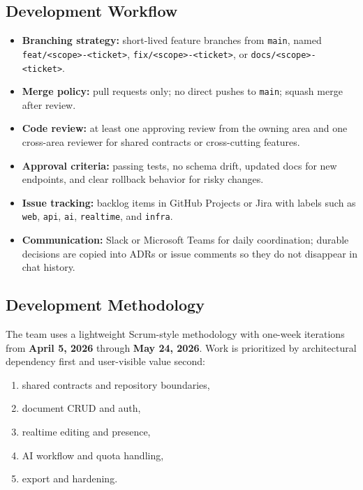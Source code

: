 \subsection{Development Workflow}

\begin{itemize}[leftmargin=1.3em]
    \item \textbf{Branching strategy:} short-lived feature branches from \texttt{main}, named \texttt{feat/<scope>-<ticket>}, \texttt{fix/<scope>-<ticket>}, or \texttt{docs/<scope>-<ticket>}.
    \item \textbf{Merge policy:} pull requests only; no direct pushes to \texttt{main}; squash merge after review.
    \item \textbf{Code review:} at least one approving review from the owning area and one cross-area reviewer for shared contracts or cross-cutting features.
    \item \textbf{Approval criteria:} passing tests, no schema drift, updated docs for new endpoints, and clear rollback behavior for risky changes.
    \item \textbf{Issue tracking:} backlog items in GitHub Projects or Jira with labels such as \texttt{web}, \texttt{api}, \texttt{ai}, \texttt{realtime}, and \texttt{infra}.
    \item \textbf{Communication:} Slack or Microsoft Teams for daily coordination; durable decisions are copied into ADRs or issue comments so they do not disappear in chat history.
\end{itemize}

\subsection{Development Methodology}

The team uses a lightweight Scrum-style methodology with one-week iterations from \textbf{April 5, 2026} through \textbf{May 24, 2026}. Work is prioritized by architectural dependency first and user-visible value second:

\begin{enumerate}[leftmargin=1.4em]
    \item shared contracts and repository boundaries,
    \item document CRUD and auth,
    \item realtime editing and presence,
    \item AI workflow and quota handling,
    \item export and hardening.
\end{enumerate}

